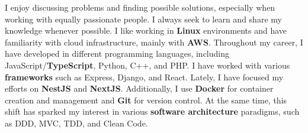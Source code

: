 

%
\begin{cventries}

\vspace{-3.5mm}  
\cventry
  {}
  {}
  {}
  {}
  {I enjoy discussing problems and finding possible solutions, especially when working with equally passionate people. I always seek to learn and share my knowledge whenever possible. I like working in \textbf{Linux} environments and have familiarity with cloud infrastructure, mainly with \textbf{AWS}. Throughout my career, I have developed in different programming languages, including JavaScript/\textbf{TypeScript}, Python, C++, and PHP. I have worked with various \textbf{frameworks} such as Express, Django, and React. Lately, I have focused my efforts on \textbf{NestJS} and \textbf{NextJS}. Additionally, I use \textbf{Docker} for container creation and management and \textbf{Git} for version control. At the same time, this shift has sparked my interest in various \textbf{software architecture} paradigms, such as DDD, MVC, TDD, and Clean Code.}
\end{cventries}